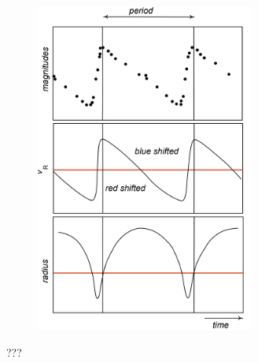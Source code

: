 \begin{figure}[H]
\begin{subfigure}{.45\textwidth}
            \includegraphics[width=0.79\textwidth]{report/images/chap2_foundations/gautschy_2003.png}
        \end{subfigure}
        \caption{???}
        \label{2.3b}
        \end{figure}
        
